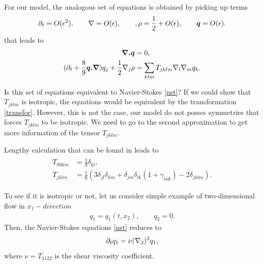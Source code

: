 For our model, the analogous set of equations is obtained by picking up terms
\begin{align}
\partial_t = O(\epsilon^2), \qquad \nabla = O(\epsilon), \qquad, \rho = \frac{1}{2} + O(\epsilon), \qquad \bm{q} = O(\epsilon).
\end{align} 
that leads to
\begin{align}
\begin{split}
\bm{\nabla . q} &= 0,\\ 
(\partial_t + \frac{8}{9} \bm{q . \nabla}) q_j + \frac{1}{2}\nabla_j\rho &= \sum_{klm} T_{jklm}\nabla_l \nabla_m q_k.
\end{split}
\end{align}

Is this set of equations equivalent to Navier-Stokes \ref{nst}?
If we could show that $T_{jklm}$ is isotropic, the equations would be equivalent by the transformation \ref{transfor}.
However, this is not the case, our model do not posses symmetries that forces $T_{jklm}$ to be isotropic.
We need to go to the second approximation to get more information of the tensor $T_{jklm}$.

Lengthy calculation that can be found in \cite{nasilowski} leads to
\begin{align} \label{vistens}
\begin{split}
T_{00km} &= \frac{1}{9} \delta_{kl}, \\
T_{jklm} &= \frac{1}{6} (3 \delta_{jl}\delta_{km} + \delta_{jm} \delta_{lk}(1 + \gamma_{mk}) - 2 \delta_{jklm}).
\end{split}
\end{align}

To see if it is isotropic or not, let us consider simple example of two-dimensional flow in $x_1-direction$
\begin{align}
q_1 = q_1(t,x_2), \qquad q_2 = 0.
\end{align}
Then, the Navier-Stokes equations \ref{nst} reduces to 
\begin{align}
\partial_t q_1 = \nu (\nabla_2)^2 q_1,
\end{align}
where $\nu = T_{1122}$ is the shear viscosity coefficient.

\bigskip


